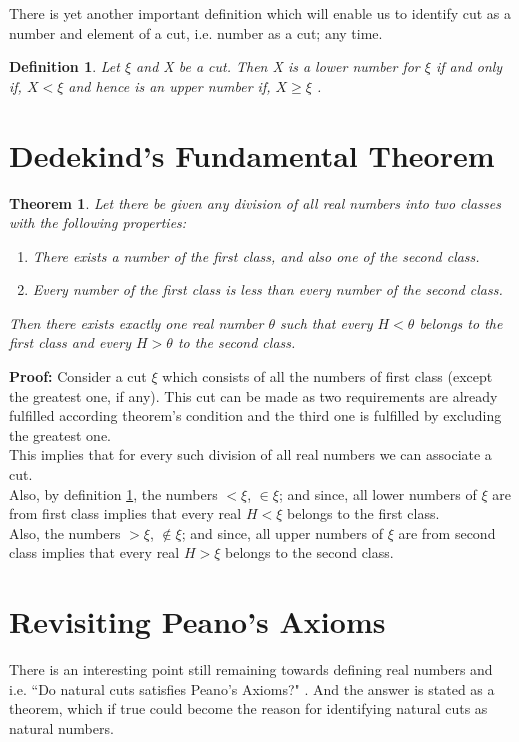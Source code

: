 \documentclass[12pt,a4paper,final,titlepage]{article}
\newtheorem{dfn}{Definition}
\newtheorem{thm}{Theorem}
\begin{document}
There is yet another important definition which will enable us to identify cut as a number and element of a cut, i.e. number as a cut; any time.
\begin{dfn} \label{def11}
Let $\xi$ and X be a cut. Then X is a lower number for $\xi$ if and only if, $X<\xi$ and hence is an upper number if, $X\geq \xi$ .
\end{dfn}

\bigskip
\bigskip
\bigskip

\section{Dedekind's Fundamental Theorem}
\begin{thm} \label{thm14}
Let there be given any division of all real numbers into two classes with the following properties:
\begin{enumerate}
\item There exists a number of the first class, and also one of the second class.
\item Every number of the first class is less than every number of the second class.
\end{enumerate}
Then there exists exactly one real number $\theta$ such that every $H<\theta$ belongs to the first class and every $H>\theta$ to the second class.
\end{thm}
\textbf{Proof:} Consider a cut $\xi$ which consists of all the numbers of first class (except the greatest one, if any). This cut can be made as two requirements are already fulfilled according theorem's condition and the third one is fulfilled by excluding the greatest one. \\
This implies that for every such division of all real numbers we can associate a cut.\\
Also, by definition \ref{def11}, the numbers $< \xi$, $\in \xi$; and since, all lower numbers of $\xi$ are from first class implies that every real $H<\xi$ belongs to the first class.\\
Also, the numbers $> \xi$, $\notin \xi$; and since, all upper numbers of $\xi$ are from second class implies that every real $H>\xi$ belongs to the second class.\\

\bigskip

\section{Revisiting Peano's Axioms}
There is an interesting point still remaining towards defining real numbers and i.e. ``Do natural cuts satisfies Peano's Axioms?" . And the answer is stated as a theorem, which if true could become the reason for identifying natural cuts as natural numbers.
\end{document}
